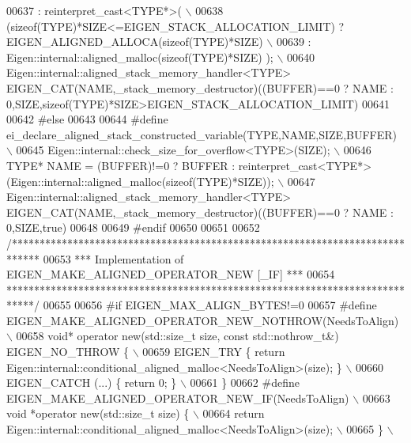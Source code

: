 \begin{DoxyCode}
00637 \textcolor{preprocessor}{               : reinterpret\_cast<TYPE*>( \(\backslash\)}
00638 \textcolor{preprocessor}{                      (sizeof(TYPE)*SIZE<=EIGEN\_STACK\_ALLOCATION\_LIMIT) ?
       EIGEN\_ALIGNED\_ALLOCA(sizeof(TYPE)*SIZE) \(\backslash\)}
00639 \textcolor{preprocessor}{                    : Eigen::internal::aligned\_malloc(sizeof(TYPE)*SIZE) );  \(\backslash\)}
00640 \textcolor{preprocessor}{    Eigen::internal::aligned\_stack\_memory\_handler<TYPE>
       EIGEN\_CAT(NAME,\_stack\_memory\_destructor)((BUFFER)==0 ? NAME : 0,SIZE,sizeof(TYPE)*SIZE>EIGEN\_STACK\_ALLOCATION\_LIMIT)}
00641 
00642 \textcolor{preprocessor}{#else}
00643 
00644 \textcolor{preprocessor}{  #define ei\_declare\_aligned\_stack\_constructed\_variable(TYPE,NAME,SIZE,BUFFER) \(\backslash\)}
00645 \textcolor{preprocessor}{    Eigen::internal::check\_size\_for\_overflow<TYPE>(SIZE); \(\backslash\)}
00646 \textcolor{preprocessor}{    TYPE* NAME = (BUFFER)!=0 ? BUFFER :
       reinterpret\_cast<TYPE*>(Eigen::internal::aligned\_malloc(sizeof(TYPE)*SIZE));    \(\backslash\)}
00647 \textcolor{preprocessor}{    Eigen::internal::aligned\_stack\_memory\_handler<TYPE>
       EIGEN\_CAT(NAME,\_stack\_memory\_destructor)((BUFFER)==0 ? NAME : 0,SIZE,true)}
00648     
00649 \textcolor{preprocessor}{#endif}
00650 
00651 
00652 \textcolor{comment}{/*****************************************************************************}
00653 \textcolor{comment}{*** Implementation of EIGEN\_MAKE\_ALIGNED\_OPERATOR\_NEW [\_IF]                ***}
00654 \textcolor{comment}{*****************************************************************************/}
00655 
00656 \textcolor{preprocessor}{#if EIGEN\_MAX\_ALIGN\_BYTES!=0}
00657 \textcolor{preprocessor}{  #define EIGEN\_MAKE\_ALIGNED\_OPERATOR\_NEW\_NOTHROW(NeedsToAlign) \(\backslash\)}
00658 \textcolor{preprocessor}{      void* operator new(std::size\_t size, const std::nothrow\_t&) EIGEN\_NO\_THROW \{ \(\backslash\)}
00659 \textcolor{preprocessor}{        EIGEN\_TRY \{ return Eigen::internal::conditional\_aligned\_malloc<NeedsToAlign>(size); \} \(\backslash\)}
00660 \textcolor{preprocessor}{        EIGEN\_CATCH (...) \{ return 0; \} \(\backslash\)}
00661 \textcolor{preprocessor}{      \}}
00662 \textcolor{preprocessor}{  #define EIGEN\_MAKE\_ALIGNED\_OPERATOR\_NEW\_IF(NeedsToAlign) \(\backslash\)}
00663 \textcolor{preprocessor}{      void *operator new(std::size\_t size) \{ \(\backslash\)}
00664 \textcolor{preprocessor}{        return Eigen::internal::conditional\_aligned\_malloc<NeedsToAlign>(size); \(\backslash\)}
00665 \textcolor{preprocessor}{      \} \(\backslash\)}

\end{DoxyCode}
